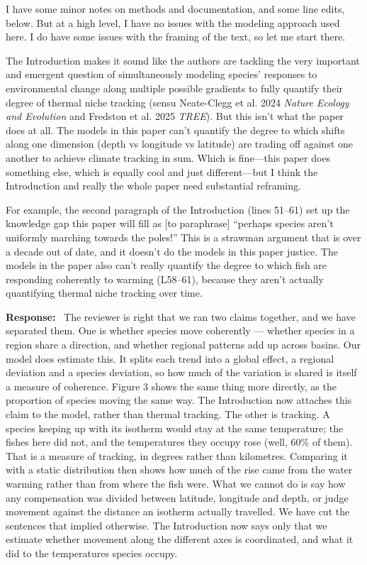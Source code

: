 \documentclass[11pt]{article}
\newcommand{\reviewer}[1]{\par\medskip\noindent\textcolor{revcolor}{#1}\par}
\newenvironment{reply}
{\par\smallskip\begingroup\color{replycolor}\noindent\textbf{Response:}\ }
{\endgroup\par\medskip}
\begin{document}
\reviewer{I have some minor notes on methods and documentation, and some line
edits, below. But at a high level, I have no issues with the modeling approach used
here. I do have some issues with the framing of the text, so let me start there.}

\reviewer{The Introduction makes it sound like the authors are tackling the very
important and emergent question of simultaneously modeling species' responses to
environmental change along multiple possible gradients to fully quantify their
degree of thermal niche tracking (sensu Neate-Clegg et al. 2024 \textit{Nature
Ecology and Evolution} and Fredston et al. 2025 \textit{TREE}). But this isn't what
the paper does at all. The models in this paper can't quantify the degree to which
shifts along one dimension (depth vs longitude vs latitude) are trading off against
one another to achieve climate tracking in sum. Which is fine---this paper does
something else, which is equally cool and just different---but I think the
Introduction and really the whole paper need substantial reframing.}

\reviewer{For example, the second paragraph of the Introduction (lines 51--61) set
up the knowledge gap this paper will fill as [to paraphrase] ``perhaps species
aren't uniformly marching towards the poles!'' This is a strawman argument that is
over a decade out of date, and it doesn't do the models in this paper justice. The
models in the paper also can't really quantify the degree to which fish are
responding coherently to warming (L58--61), because they aren't actually
quantifying thermal niche tracking over time.}

\begin{reply}
The reviewer is right that we ran two claims together, and we have separated them.
One is whether species move coherently — whether species in a region share a direction, and whether regional patterns add up across basins. Our model does estimate this. It splits each trend into a global effect, a regional deviation and a species deviation, so how much of the variation is shared is itself a measure of coherence. Figure 3 shows the same thing more directly, as the proportion of species moving the same way. The Introduction now attaches this claim to the model, rather than thermal tracking.
The other is tracking. A species keeping up with its isotherm would stay at the same temperature; the fishes here did not, and the temperatures they occupy rose (well, 60\% of them). That is a measure of tracking, in degrees rather than kilometres. Comparing it with a static distribution then shows how much of the rise came from the water warming rather than from where the fish were.
What we cannot do is say how any compensation was divided between latitude, longitude and depth, or judge movement against the distance an isotherm actually travelled. We have cut the sentences that implied otherwise. The Introduction now says only that we estimate whether movement along the different axes is coordinated, and what it did to the temperatures species occupy.
\end{reply}
\end{document}
